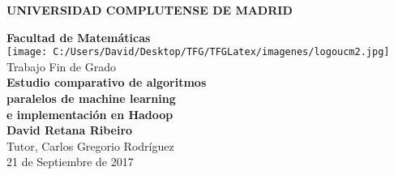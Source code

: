 
\begin{titlepage}
  \begin{center}
    \vspace*{1cm}
    \Huge
    \textbf{UNIVERSIDAD COMPLUTENSE DE MADRID}\\
    \vspace{0.8cm}
    \LARGE

    \textbf{Facultad de Matemáticas}\\
    \vspace{0.5cm}
    \vspace{0.5cm} 
    \texttt{[image: C:/Users/David/Desktop/TFG/TFGLatex/imagenes/logoucm2.jpg]} \\

    Trabajo Fin de Grado\\
    \vspace{0.8cm}
    \Huge
    \textbf{Estudio comparativo de algoritmos}\\
    \textbf{paralelos de machine learning}\\
    \textbf{e implementación en Hadoop}\\
    \vfill
    \LARGE
    \vspace{1cm}
    \textbf{David Retana Ribeiro}\\
    \vspace{0.5cm}
    Tutor, Carlos Gregorio Rodríguez\\
    \vspace{0.5cm}
    \Large
    21 de Septiembre de 2017 
  \end{center}
\end{titlepage}

